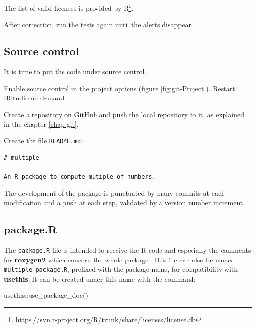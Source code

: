 \documentclass[
  12pt,
  american,
  a4paper,
  extrafontsizes,onecolumn,openright
  ]{memoir}
\newenvironment{Shaded}{\begin{snugshade}}{\end{snugshade}}
\newcommand{\FunctionTok}[1]{\textcolor[rgb]{0.00,0.00,0.00}{#1}}
\newcommand{\NormalTok}[1]{#1}
\newcommand{\SpecialCharTok}[1]{\textcolor[rgb]{0.00,0.00,0.00}{#1}}
\begin{document}
\normalsize

The list of valid licenses is provided by R\footnote{\url{https://svn.r-project.org/R/trunk/share/licenses/license.db}}.

After correction, run the tests again until the alerts disappear.

\hypertarget{sec:package-cds}{%
\subsection{Source control}\label{sec:package-cds}}

It is time to put the code under source control.

Enable source control in the project options (figure \ref{fig:git-Project}).
Restart RStudio on demand.

Create a repository on GitHub and push the local repository to it, as explained in the chapter \ref{chap-git}.

Create the file \texttt{README.md}:

\begin{verbatim}
# multiple

An R package to compute mutiple of numbers.
\end{verbatim}

The development of the package is punctuated by many commits at each modification and a push at each step, validated by a version number increment.

\hypertarget{package.r}{%
\subsection{package.R}\label{package.r}}

The \texttt{package.R} file is intended to receive the R code and especially the comments for \textbf{roxygen2} which concern the whole package.
This file can also be named \texttt{multiple-package.R}, prefixed with the package name, for compatibility with \textbf{usethis}.
It can be created under this name with the command:

\scriptsize

\begin{Shaded}
\begin{Highlighting}[]
\NormalTok{usethis}\SpecialCharTok{::}\FunctionTok{use\_package\_doc}\NormalTok{()}
\end{Highlighting}
\end{Shaded}

\normalsize
\end{document}
